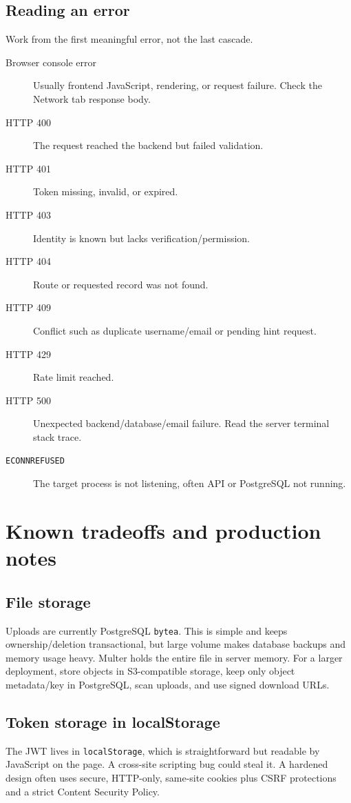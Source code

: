 \documentclass[11pt,oneside]{book}
\newcommand{\code}[1]{\texttt{#1}}
\begin{document}
\section{Reading an error}
Work from the first meaningful error, not the last cascade.
\begin{description}
  \item[Browser console error] Usually frontend JavaScript, rendering, or request failure. Check the Network tab response body.
  \item[HTTP 400] The request reached the backend but failed validation.
  \item[HTTP 401] Token missing, invalid, or expired.
  \item[HTTP 403] Identity is known but lacks verification/permission.
  \item[HTTP 404] Route or requested record was not found.
  \item[HTTP 409] Conflict such as duplicate username/email or pending hint request.
  \item[HTTP 429] Rate limit reached.
  \item[HTTP 500] Unexpected backend/database/email failure. Read the server terminal stack trace.
  \item[\code{ECONNREFUSED}] The target process is not listening, often API or PostgreSQL not running.
\end{description}

\chapter{Known tradeoffs and production notes}

\section{File storage}
Uploads are currently PostgreSQL \code{bytea}. This is simple and keeps ownership/deletion transactional, but large volume makes database backups and memory usage heavy. Multer holds the entire file in server memory. For a larger deployment, store objects in S3-compatible storage, keep only object metadata/key in PostgreSQL, scan uploads, and use signed download URLs.

\section{Token storage in localStorage}
The JWT lives in \code{localStorage}, which is straightforward but readable by JavaScript on the page. A cross-site scripting bug could steal it. A hardened design often uses secure, HTTP-only, same-site cookies plus CSRF protections and a strict Content Security Policy.
\end{document}
